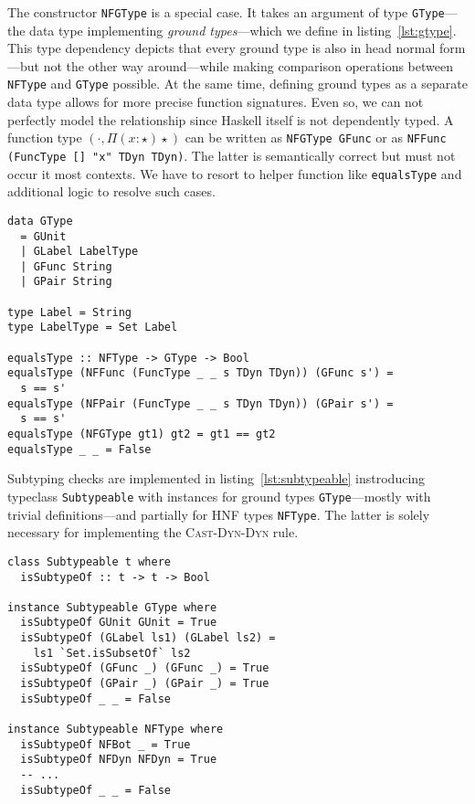 The constructor \texttt{NFGType} is a special case. It takes an argument of type \texttt{GType}---the data type implementing \emph{ground types}---which we define in listing~\ref{lst:gtype}. This type dependency depicts that every ground type is also in head normal form---but not the other way around---while making comparison operations between \texttt{NFType} and \texttt{GType} possible. At the same time, defining ground types as a separate data type allows for more precise function signatures. Even so, we can not perfectly model the relationship since Haskell itself is not dependently typed. A function type $(\cdot, \Pi(x:\star)\star)$ can be written as \texttt{NFGType GFunc} or as \texttt{NFFunc (FuncType [] "x" TDyn TDyn)}. The latter is semantically correct but must not occur it most contexts. We have to resort to helper function like \texttt{equalsType} and additional logic to resolve such cases.

\begin{lstlisting}[float,
  caption=Ground type definition (\texttt{ProcessEnvironment.hs}),
  label=lst:gtype]
data GType
  = GUnit
  | GLabel LabelType
  | GFunc String
  | GPair String

type Label = String
type LabelType = Set Label

equalsType :: NFType -> GType -> Bool
equalsType (NFFunc (FuncType _ _ s TDyn TDyn)) (GFunc s') =
  s == s'
equalsType (NFPair (FuncType _ _ s TDyn TDyn)) (GPair s') =
  s == s'
equalsType (NFGType gt1) gt2 = gt1 == gt2
equalsType _ _ = False
\end{lstlisting}

Subtyping checks are implemented in listing~\ref{lst:subtypeable} instroducing typeclass \texttt{Subtypeable} with instances for ground types \texttt{GType}---mostly with trivial definitions---and partially for HNF types \texttt{NFType}. The latter is solely necessary for implementing the \textsc{Cast-Dyn-Dyn} rule.

\begin{lstlisting}[float,
  label=lst:subtypeable,
  caption=Subtypeable typeclass (\texttt{ProcessEnvironment.hs})]
class Subtypeable t where
  isSubtypeOf :: t -> t -> Bool

instance Subtypeable GType where
  isSubtypeOf GUnit GUnit = True
  isSubtypeOf (GLabel ls1) (GLabel ls2) =
    ls1 `Set.isSubsetOf` ls2
  isSubtypeOf (GFunc _) (GFunc _) = True
  isSubtypeOf (GPair _) (GPair _) = True
  isSubtypeOf _ _ = False

instance Subtypeable NFType where
  isSubtypeOf NFBot _ = True
  isSubtypeOf NFDyn NFDyn = True
  -- ...
  isSubtypeOf _ _ = False
\end{lstlisting}


